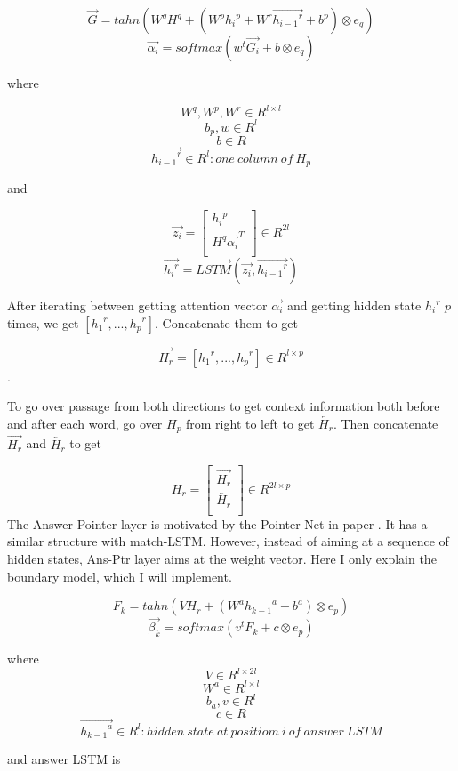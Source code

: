 \documentclass[modernstyle,12pt]{sjsuthesis}
\theoremstyle{definition}
\begin{document}
$$\overrightarrow{G} = tahn(W^qH^q + (W^p{h_i}^p + W^r\overrightarrow{{h_{i-1}}^r} + b^p) \otimes e_q)$$
$$\overrightarrow{\alpha _i} = softmax(w^t\overrightarrow{G_i} + b \otimes e_q)$$


where

$$W^q, W^p, W^r\in R^{l \times l} $$
$$b_p, w\in R^{l}  $$
$$b \in R $$
$$\overrightarrow{{h_{i-1}}^r}\in R^{l}: one\ column\ of\ H_p  $$

and

\[ \overrightarrow{z_i} =
\begin{bmatrix}
{h_i}^p \\
H^q\overrightarrow{ {\alpha _i}}^T \\
\end{bmatrix}
\in R^{2l}
\]
$$\overrightarrow{{h_i}^r} = \overrightarrow{LSTM}(\overrightarrow{z_i}, \overrightarrow{{h_{i-1}}^r})$$

After iterating between getting attention vector $\overrightarrow{\alpha _i}$ and getting hidden state ${{h_{i}}^r}$ $p$ times, we get $[{{h_{1}}^r}, ..., {{h_{p}}^r}]$. Concatenate them to get

$$\overrightarrow{H_r} = [{{h_{1}}^r}, ..., {{h_{p}}^r}] \in R^{l \times p}$$.

To go over passage from both directions to get context information both before and after each word, go over $H_p$ from right to left to get $\overleftarrow{H_r}$. Then concatenate $\overrightarrow{H_r}$ and $\overleftarrow{H_r}$ to get

\[ H_r =
\begin{bmatrix}
\overrightarrow{H_r} \\
\overleftarrow{H_r} \\
\end{bmatrix}
\in R^{2l \times p}
\]
The Answer Pointer layer is motivated by the Pointer Net in paper \cite{vinyals2015pointer}. It has a similar structure with match-LSTM. However, instead of aiming at a sequence of hidden states, Ans-Ptr layer aims at the weight vector. Here I only explain the boundary model, which I will implement.

$$F_k = tahn(VH_r + (W^a{h_{k-1}}^a +  b^a) \otimes e_p)$$
$$\overrightarrow{\beta _k} = softmax(v^tF_k + c \otimes e_p)$$


where
$$V \in R^{l \times 2l}$$
$$W^a\in R^{l \times l} $$
$$b_a, v\in R^{l}  $$
$$c \in R $$
$$\overrightarrow{{h_{k-1}}^a}\in R^{l}: hidden\ state\ at\ positiom\ i\ of\ answer\ LSTM  $$

and answer LSTM is
\end{document}
